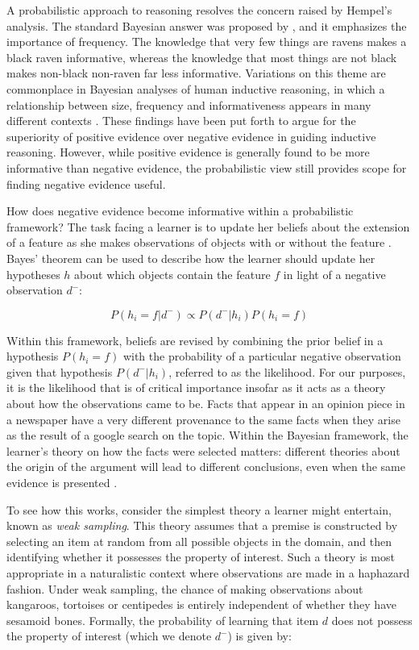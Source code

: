 \documentclass[authoryear,11pt]{elsarticle}
\begin{document}
A probabilistic approach to reasoning resolves the concern raised by Hempel's analysis. The standard Bayesian answer was proposed by \citet{Good1960}, and it emphasizes the importance of frequency. The knowledge that very few things are ravens makes a black raven informative, whereas the knowledge that most things are not black makes non-black non-raven far less informative. Variations on this theme are commonplace in Bayesian analyses of human inductive reasoning, in which a relationship between size, frequency and informativeness appears in many different contexts \citep[e.g.][]{OaksfordChater1994,NavarroPerfors2011,NavarroPerfors2010,TenenbaumGriffiths2001,KlaymanHa1987}. These findings have been put forth to argue for the superiority of positive evidence over negative evidence in guiding inductive reasoning. However, while positive evidence is generally found to be more informative than negative evidence, the probabilistic view still provides scope for finding negative evidence useful.

How does negative evidence become informative within a probabilistic framework? The task facing a learner is to update her beliefs about the extension of a feature as she makes observations of objects with or without the feature \citep{Heit1998bay, TenenbaumGriffiths2001}. Bayes' theorem can be used to describe how the learner should update her hypotheses $h$ about which objects contain the feature $f$ in light of a negative observation $d^-$:

\begin{equation}
P(h_i=f|d^-) \propto P(d^-|h_i) P(h_i=f)
\label{eq:bayes}
\end{equation}

\noindent
Within this framework, beliefs are revised by combining the prior belief in a hypothesis $P(h_i=f)$ with the probability of a particular negative observation given that hypothesis $P(d^-|h_i)$, referred to as the likelihood. For our purposes, it is the likelihood that is of critical importance insofar as it acts as a theory about how the observations came to be. Facts that appear in an opinion piece in a newspaper have a very different provenance to the same facts when they arise as the result of a google search on the topic. Within the Bayesian framework, the learner's theory on how the facts were selected matters: different theories about the origin of the argument will lead to different conclusions, even when the same evidence is presented \citep[see also][]{Shaftoetal2012}.

To see how this works, consider the simplest theory a learner might entertain, known as \textit{weak sampling}. This theory assumes that a premise is constructed by selecting an item at random from all possible objects in the domain, and then identifying whether it possesses the property of interest. Such a theory is most appropriate in a naturalistic context where observations are made in a haphazard fashion. Under weak sampling, the chance of making observations about kangaroos, tortoises or centipedes is entirely independent of whether they have sesamoid bones. Formally, the probability of learning that item $d$ does not possess the property of interest (which we denote $d^-$) is given by:
\end{document}
